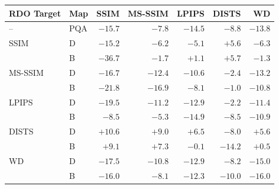\begin{tabular}{llrrrrr}
\toprule
RDO Target & Map & SSIM & MS-SSIM & LPIPS & DISTS & WD \\
\midrule
-- & PQA & $-15.7$ & $-7.8$ & $-14.5$ & $-8.8$ & $-13.8$ \\
\midrule
\rowcolor{metband}SSIM & D & $-15.2$ & $-6.2$ & $-5.1$ & $+5.6$ & $-6.3$ \\
\rowcolor{metband} & B & $\mathbf{-36.7}$ & $-1.7$ & $+1.1$ & $+5.7$ & $-1.3$ \\
MS-SSIM & D & $-16.7$ & $-12.4$ & $-10.6$ & $-2.4$ & $-13.2$ \\
 & B & $-21.8$ & $\mathbf{-16.9}$ & $-8.1$ & $-1.0$ & $-10.8$ \\
\rowcolor{metband}LPIPS & D & $-19.5$ & $-11.2$ & $-12.9$ & $-2.2$ & $-11.4$ \\
\rowcolor{metband} & B & $-8.5$ & $-5.3$ & $\mathbf{-14.9}$ & $-8.5$ & $-10.9$ \\
DISTS & D & $+10.6$ & $+9.0$ & $+6.5$ & $-8.0$ & $+5.6$ \\
 & B & $+9.1$ & $+7.3$ & $-0.1$ & $\mathbf{-14.2}$ & $+0.5$ \\
\rowcolor{metband}WD & D & $-17.5$ & $-10.8$ & $-12.9$ & $-8.2$ & $-15.0$ \\
\rowcolor{metband} & B & $-16.0$ & $-8.1$ & $-12.3$ & $-10.0$ & $\mathbf{-16.0}$ \\
\bottomrule
\end{tabular}
